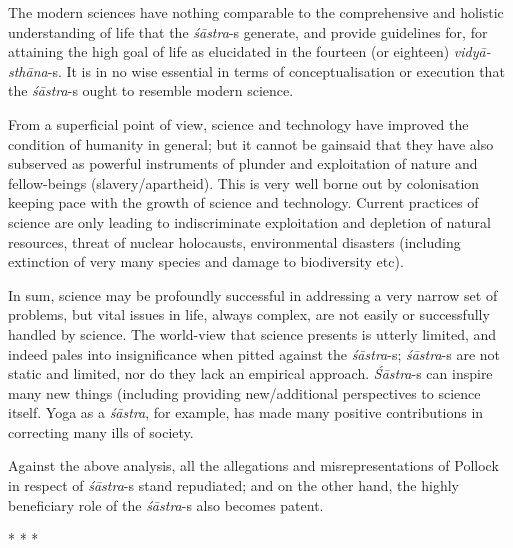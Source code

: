 The modern sciences have nothing comparable to the comprehensive and holistic understanding of life that the \textit{śāstra}-s generate, and provide guidelines for, for attaining the high goal of life as elucidated in the fourteen (or eighteen) \textit{vidyā-sthāna}-s. It is in no wise essential in terms of conceptualisation or execution that the \textit{śāstra}-s ought to resemble modern science.

From a superficial point of view, science and technology have improved the condition of humanity in general; but it cannot be gainsaid that they have also subserved as powerful instruments of plunder and exploitation of nature and fellow-beings (slavery/apartheid). This is very well borne out by colonisation keeping pace with the growth of science and technology. Current practices of science are only leading to indiscriminate exploitation and depletion of natural resources, threat of nuclear holocausts, environmental disasters (including extinction of very many species and damage to biodiversity etc).

In sum, science may be profoundly successful in addressing a very narrow set of problems, but vital issues in life, always complex, are not easily or successfully handled by science. The world-view that science presents is utterly limited, and indeed pales into insignificance when pitted against the \textit{śāstra}-s; \textit{śāstra}-s are not static and limited, nor do they lack an empirical approach. \textit{Śāstra}-s can inspire many new things (including providing new/additional perspectives to science itself. Yoga as a \textit{śāstra}, for example, has made many positive contributions in correcting many ills of society.

Against the above analysis, all the allegations and misrepresentations of Pollock in respect of \textit{śāstra}-s stand repudiated; and on the other hand, the highly beneficiary role of the \textit{śāstra}-s also becomes patent.

\vskip -5pt

\begin{center}
* * *
\end{center}

\vskip -5pt

